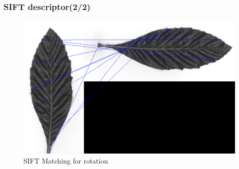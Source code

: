 \documentclass[xcolor=table]{beamer}
\begin{document}
\begin{frame} \frametitle{SIFT descriptor(2/2)}

\begin{figure}[htbp]
    \begin{minipage}[c]{.45\linewidth}
      \begin{center}
	\includegraphics[scale=0.20]{Capture1.png}
	\caption{SIFT Matching for rotation}
	\label{figure:Illustration}
      \end{center}
    \end{minipage}
    \hfill
    \begin{minipage}[c]{.45\linewidth}
      \begin{center}

\end{center}
\end{minipage}
\end{figure}
\end{frame}
\end{document}
